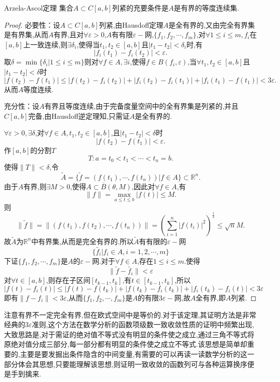 \documentclass[lang=cn,18pt]{elegantbook}
\begin{document}
\begin{theorem}{Arzela-Ascol定理}
    集合$A \subset C[a,b]$列紧的充要条件是$A$是有界的等度连续集.
\end{theorem}
\begin{proof}
    必要性：设$A \subset C[a,b]$列紧,由Hausdoff定理$A$是全有界的,又由完全有界集是有界集,从而$A$有界,且对$\forall \varepsilon >0$,$A$有有限$\varepsilon-$网,$\{f_1,f_2,\cdots,f_m\}$,对$\forall 1\leqslant i \leqslant m,f_i$在$[a,b]$上一致连续,则$\exists \delta_i$,使得当$t_1,t_2\in[a,b]$且$|t_1-t_2|<\delta_i$时,有
    $$|f_i(t_1)-f_i(t_2)|<\varepsilon .$$
    取$\delta=\min\{\delta_i | 1 \leqslant i \leqslant m\}$则对$\forall f \in A,\exists i$,使得$f \in B(f_i,\varepsilon)$,当$\forall t_1,t_2 \in [a,b]$且$|t_1-t_2|<\delta$时
    $$|f(t_2)-f(t_1)|\leqslant |f(t_2)-f_i(t_2)|+|f_i(t_2)-f_i(t_1)|+|f_i(t_1)-f(t_1)|<3\varepsilon.$$
    从而$A$等度连续.

    充分性：设$A$有界且等度连续,由于完备度量空间中的全有界集是列紧的,并且$C[a,b]$完备,由Hausdoff逆定理知,只需证$A$是全有界的.

    $\forall \varepsilon >0,\exists \delta$,对$\forall f \in A,t_1,t_2 \in [a,b]$,且$|t_1-t_2|<\delta$时
    $$|f(t_2)-f(t_1)|<\varepsilon.$$
    作$[a,b]$的分割$T$
    $$T:a=t_0 < t_1 < \cdots < t_n = b.$$
    使得$\|T\| < \delta{}$,令
    $$\widetilde{A}=\{\widetilde{f}=(f(t_1),\cdots,f(t_n))|f \in A \} \subset \mathbb{R}^n.$$
    由于$A$有界,则$\exists M >0$,使得$A \subset \overline{B}(\theta,M)$,因此对$\forall f \in A$,有
    $$\|f\|=\max\limits_{a \leqslant t \leqslant b}|f(t)| \leqslant M.$$
    则
    $$\|\widetilde{f}\|=\|(f(t_1),f(t_2),\cdots,f(t_n))\|=\left(\sum\limits_{i=1}^{n}|f(t_i)|^2 \right)^{\frac{1}{2}} \leqslant \sqrt{n}M.$$
    故$\widetilde{A}$为$\mathbb{R}^n$中有界集,从而是完全有界的.所以$\widetilde{A}$有有限的$\varepsilon -$网
    $$\{\widetilde{f_i}|f_i \in A,i=1,2,\cdots,m\}$$
    下证$\{f_1,f_2,\cdots,f_m\}$是$A$的$\varepsilon -$网.对于$\forall f \in A$,存在$1 \leqslant i \leqslant m$.使得
    $$\| \widetilde{f}-\widetilde{f_i}\|<\varepsilon$$
    对$\forall t \in [a,b]$,则存在子区间$[t_{k-1},t_k]$,有$t\in [t_{k-1},t_k]$,所以
    $$|f(t)-f_i(t)|\leqslant |f(t)-f(t_k)|+|f(t_k)-f_i(t_k)|+|f_i(t_k)-f_i(t)|< 3\varepsilon$$
    即有$\|f-f_i \| < 3\varepsilon$,从而$\{f_1,f_2,\cdots,f_m\}$是$A$的有限$3\varepsilon -$网,故$A$全有界,即$A$列紧.
\end{proof}
\begin{note}
    注意有界不一定完全有界,但在欧式空间中是等价的.对于该定理,其证明方法是非常经典的$3\varepsilon$准则,这个方法在数学分析的函数项级数一致收敛性质的证明中频繁出现,大致思路是,对于需证的绝对值不等式没有明显的条件使之成立,通过三角不等式将原绝对值分成三部分,每一部分都有明显的条件使之成立不等式.该思想是简单却重要的,主要是要发掘出条件隐含的中间变量,有需要的可以再读一读数学分析的这一部分体会其思想,只要能理解该思想,则证明一致收敛的函数列可与各种运算换序便是手到擒来.
\end{note}
\end{document}
